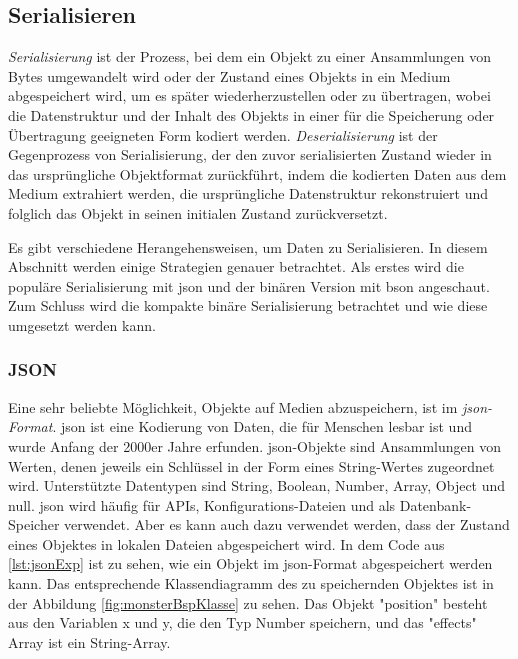 \subsection{Serialisieren}

\textit{Serialisierung} ist der Prozess, bei dem ein Objekt zu einer Ansammlungen von Bytes umgewandelt wird oder der Zustand eines Objekts in ein Medium abgespeichert wird, um es später wiederherzustellen oder zu übertragen, wobei die Datenstruktur und der Inhalt des Objekts in einer für die Speicherung oder Übertragung geeigneten Form kodiert werden. \textit{Deserialisierung} ist der Gegenprozess von Serialisierung, der den zuvor serialisierten Zustand wieder in das ursprüngliche Objektformat zurückführt, indem die kodierten Daten aus dem Medium extrahiert werden, die ursprüngliche Datenstruktur rekonstruiert und folglich das Objekt in seinen initialen Zustand zurückversetzt.\cite{codeguruWorkingWith}

Es gibt verschiedene Herangehensweisen, um Daten zu Serialisieren. In diesem Abschnitt werden einige Strategien genauer betrachtet. Als erstes wird die populäre Serialisierung mit \ac{json} und der binären Version mit \ac{bson} angeschaut. Zum Schluss wird die kompakte binäre Serialisierung betrachtet und wie diese umgesetzt werden kann.

\subsubsection{JSON}
Eine sehr beliebte Möglichkeit, Objekte auf Medien abzuspeichern, ist im \textit{\ac{json}-Format}. \ac{json} ist eine Kodierung von Daten, die für Menschen lesbar ist und wurde Anfang der 2000er Jahre erfunden. \ac{json}-Objekte sind Ansammlungen von Werten, denen jeweils ein Schlüssel in der Form eines String-Wertes zugeordnet wird. Unterstützte Datentypen sind String, Boolean, Number, Array, Object und null. \ac{json} wird häufig für APIs, Konfigurations-Dateien und als Datenbank-Speicher verwendet. Aber es kann auch dazu verwendet werden, dass der Zustand eines Objektes in lokalen Dateien abgespeichert wird.\cite{mongodbJSONBSON} 
In dem Code aus \ref{lst:jsonExp} ist zu sehen, wie ein Objekt im \ac{json}-Format abgespeichert werden kann. Das entsprechende Klassendiagramm des zu speichernden Objektes ist in der Abbildung \ref{fig:monsterBspKlasse} zu sehen. Das Objekt "position" besteht aus den Variablen x und y, die den Typ Number speichern, und das "effects" Array ist ein String-Array. 

